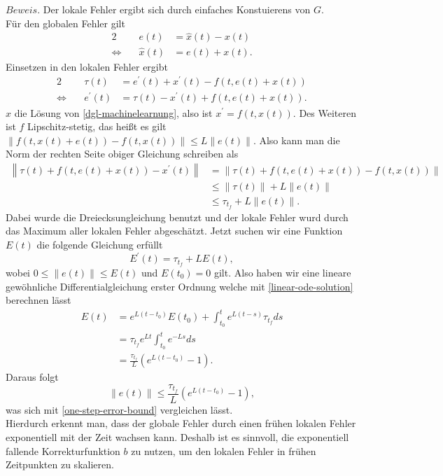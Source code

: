 $Beweis.$ Der lokale Fehler ergibt sich durch einfaches Konstuierens von $G$.\\
Für den globalen Fehler gilt
\begin{alignat*}{2}
    &e(t) &= \hat{x}(t) - x(t)\\
    \Leftrightarrow \quad &\hat{x}(t) &= e(t) + x(t).
\end{alignat*}
Einsetzen in den lokalen Fehler ergibt
\begin{alignat*}{2}
    &\tau(t) &= e^{\prime}(t) + x^{\prime}(t) - f(t,e(t)+x(t))\\
    \Leftrightarrow \quad &e^{\prime}(t) &= \tau(t) - x^{\prime}(t) + f(t,e(t) + x(t)).
\end{alignat*}
$x$ die Lösung von \eqref{dgl-machinelearnung}, also ist $x^{\prime}=f(t,x(t))$. Des Weiteren ist $f$ Lipschitz-stetig,
das heißt es gilt $\left\lVert f(t,x(t)+e(t)) - f(t,x(t)) \right\rVert \leq L \left\lVert e(t) \right\rVert$. Also kann
man die Norm der rechten Seite obiger Gleichung schreiben als
\begin{align*}
    \left\lVert \tau(t) + f(t,e(t) + x(t)) - x^{\prime}(t) \right\rVert
    &= \left\lVert \tau(t) + f(t,e(t) + x(t)) - f(t,x(t)) \right\rVert \\
    &\leq \left\lVert \tau(t) \right\rVert + L\left\lVert e(t) \right\rVert \\
    &\leq \tau_{t_f} + L \left\lVert e(t) \right\rVert.
\end{align*}
Dabei wurde die Dreiecksungleichung benutzt und der lokale Fehler wurd durch das Maximum aller lokalen Fehler
abgeschätzt. Jetzt suchen wir eine Funktion $E(t)$ die folgende Gleichung erfüllt
\[
    E^{\prime}(t) = \tau_{t_f} + L E(t),
\]
wobei $0 \leq \left\lVert e(t) \right\rVert \leq E(t)$ und $E(t_0) = 0$ gilt. Also haben wir eine lineare gewöhnliche
Differentialgleichung erster Ordnung welche mit \eqref{linear-ode-solution} berechnen lässt
\begin{align*}
    E(t) &= e^{L(t-t_0)}E(t_0) + \int_{t_0}^{t}e^{L(t-s)}\tau_{t_f} ds \\
    &= \tau_{t_f} e^{Lt} \int_{t_0}^{t}e^{-Ls} ds \\
    &= \frac{\tau_{t_f} }{L} \left( e^{L(t-t_0)} - 1 \right).
\end{align*}
Daraus folgt
\[
    \left\lVert e(t) \right\rVert \leq \frac{\tau_{t_f}}{L} \left( e^{L(t-t_0)} - 1 \right),
\]
was sich mit \eqref{one-step-error-bound} vergleichen lässt. \qedwhite\\
Hierdurch erkennt man, dass der globale Fehler durch einen frühen lokalen Fehler exponentiell mit der Zeit wachsen
kann. Deshalb ist es sinnvoll, die exponentiell fallende Korrekturfunktion $b$ zu nutzen, um den lokalen Fehler in
frühen Zeitpunkten zu skalieren.

